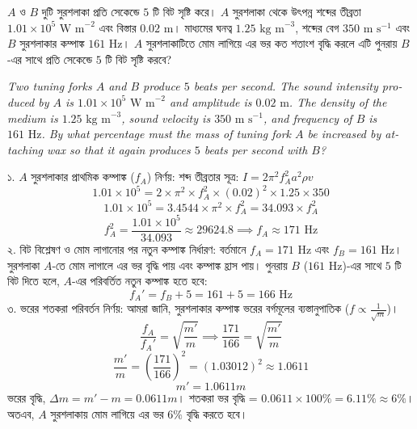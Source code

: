 \documentclass[12pt, a4paper]{article}
\begin{document}
\vspace{1.5em}

\begin{tcolorbox}[questionbox={প্রশ্ন (Question) 4}]
\noindent
$A$ ও $B$ দুটি সুরশলাকা প্রতি সেকেন্ডে $5$ টি বিট সৃষ্টি করে। $A$ সুরশলাকা থেকে উৎপন্ন শব্দের তীব্রতা $1.01 \times 10^5\text{ W m}^{-2}$ এবং বিস্তার $0.02\text{ m}$। মাধ্যমের ঘনত্ব $1.25\text{ kg m}^{-3}$, শব্দের বেগ $350\text{ m s}^{-1}$ এবং $B$ সুরশলাকার কম্পাঙ্ক $161\text{ Hz}$। $A$ সুরশলাকাটিতে মোম লাগিয়ে এর ভর কত শতাংশ বৃদ্ধি করলে এটি পুনরায় $B$-এর সাথে প্রতি সেকেন্ডে $5$ টি বিট সৃষ্টি করবে?

\vspace{0.8em}
\begin{english}
\noindent\textit{\color{darkgray}
Two tuning forks $A$ and $B$ produce $5$ beats per second. The sound intensity produced by $A$ is $1.01 \times 10^5\text{ W m}^{-2}$ and amplitude is $0.02\text{ m}$. The density of the medium is $1.25\text{ kg m}^{-3}$, sound velocity is $350\text{ m s}^{-1}$, and frequency of $B$ is $161\text{ Hz}$. By what percentage must the mass of tuning fork $A$ be increased by attaching wax so that it again produces $5$ beats per second with $B$?
}
\end{english}
\end{tcolorbox}

\vspace{1em}

\begin{tcolorbox}[solutionbox={সমাধান (Solution)}]
\noindent
১. $A$ সুরশলাকার প্রাথমিক কম্পাঙ্ক ($f_A$) নির্ণয়: শব্দ তীব্রতার সূত্র: $I = 2\pi^2 f_A^2 a^2 \rho v$
\[ 1.01 \times 10^5 = 2 \times \pi^2 \times f_A^2 \times (0.02)^2 \times 1.25 \times 350 \]
\[ 1.01 \times 10^5 = 3.4544 \times \pi^2 \times f_A^2 = 34.093 \times f_A^2 \]
\[ f_A^2 = \frac{1.01 \times 10^5}{34.093} \approx 29624.8 \implies f_A \approx 171\text{ Hz} \]
২. বিট বিশ্লেষণ ও মোম লাগানোর পর নতুন কম্পাঙ্ক নির্ধারণ: বর্তমানে $f_A = 171\text{ Hz}$ এবং $f_B = 161\text{ Hz}$। সুরশলাকা $A$-তে মোম লাগালে এর ভর বৃদ্ধি পায় এবং কম্পাঙ্ক হ্রাস পায়। পুনরায় $B$ ($161\text{ Hz}$)-এর সাথে $5$ টি বিট দিতে হলে, $A$-এর পরিবর্তিত নতুন কম্পাঙ্ক হতে হবে:
\[ f_A' = f_B + 5 = 161 + 5 = 166\text{ Hz} \]
৩. ভরের শতকরা পরিবর্তন নির্ণয়: আমরা জানি, সুরশলাকার কম্পাঙ্ক ভরের বর্গমূলের ব্যস্তানুপাতিক ($f \propto \frac{1}{\sqrt{m}}$)।
\[ \frac{f_A}{f_A'} = \sqrt{\frac{m'}{m}} \implies \frac{171}{166} = \sqrt{\frac{m'}{m}} \]
\[ \frac{m'}{m} = \left(\frac{171}{166}\right)^2 = (1.03012)^2 \approx 1.0611 \]
\[ m' = 1.0611 m \]
ভরের বৃদ্ধি, $\Delta m = m' - m = 0.0611 m$। শতকরা ভর বৃদ্ধি = $0.0611 \times 100\% = 6.11\% \approx 6\%$। \\
অতএব, $A$ সুরশলাকায় মোম লাগিয়ে এর ভর $6\%$ বৃদ্ধি করতে হবে।
\end{tcolorbox}
\end{document}
